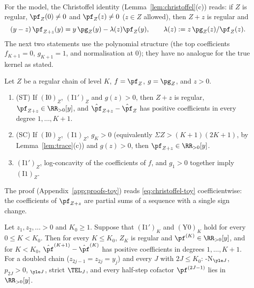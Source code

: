 For the model, the Christoffel identity (Lemma~\ref{lem:christoffel}(c)) reads: if $Z$ is regular, $\pf_Z(0)\neq0$ and
$\pf_Z(z)\neq0$ ($z\in Z$ allowed), then $Z+z$ is regular and
\begin{equation}\label{eq:christoffel-toy}
  (y-z)\,\pf_{Z+z}(y)=y\,\pg_Z(y)-\lambda(z)\pf_Z(y),\qquad \lambda(z):=z\,\pg_Z(z)/\pf_Z(z).
\end{equation}
The next two statements use the polynomial structure (the top coefficients $f_{K+1}=0$, $g_{K+1}=1$, and
normalisation at $0$); they have no analogue for the true kernel as stated.

\begin{lemma}\label{lem:ST}
Let $Z$ be a regular chain of level $K$, $f=\pf_Z$, $g=\pg_Z$, and $z>0$.
\begin{enumerate}[label=\textup{(\roman*)}]
\item \textup{(ST)} If $(\mathrm{I0})_Z$, $(\mathrm{I1}')_Z$ and $g(z)>0$, then $Z+z$ is regular,
$\pf_{Z+z}\in\RR_{>0}[y]$, and $\hat{\pf}_{Z+z}-\hat{\pf}_Z$ has positive coefficients in every degree $1,\dots,K+1$.
\item \textup{(SC)} If $(\mathrm{I0})_Z$, $(\mathrm{I1})_Z$, $g_K>0$ \textup{(}equivalently $\Sigma Z>(K+1)(2K+1)$, by
Lemma~\ref{lem:trace}(c)\textup{)} and $g(z)>0$, then $\pf_{Z+z}\in\RR_{>0}[y]$.
\item $(\mathrm{I1}')_Z$, log-concavity of the coefficients of $f$, and $g_1>0$ together imply $(\mathrm{I1})_Z$.
\end{enumerate}
\end{lemma}

The proof (Appendix~\ref{app:proofs-toy}) reads \eqref{eq:christoffel-toy} coefficientwise: the coefficients of
$\pf_{Z+z}$ are partial sums of a sequence with a single sign change.

\begin{theorem}\label{thm:A}
Let $z_1,z_2,\ldots>0$ and $K_0\ge1$. Suppose that $(\mathrm{I1}')_K$ and $(\mathrm Y0)_K$ hold for every $0\le K<K_0$.
Then for every $K\le K_0$, $Z_K$ is regular and $\pf^{(K)}\in\RR_{>0}[y]$, and for $K<K_0$, $\hat{\pf}^{(K+1)}-\hat{\pf}^{(K)}$
has positive coefficients in degrees $1,\dots,K+1$. For a doubled chain ($z_{2j-1}=z_{2j}=y_j$) and every $J$ with
$2J\le K_0$: \hyp{N}$_{\yle J}$, $p_{2J}>0$, \Rp$_{\yle J}$, strict $\TEL_J$, and every half-step cofactor
$\pf^{(2J-1)}$ lies in $\RR_{>0}[y]$.
\end{theorem}

